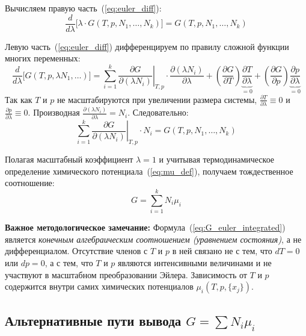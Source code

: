\documentclass[12pt,a4paper]{article}
\begin{document}
Вычисляем правую часть~(\ref{eq:euler_diff}):
\begin{equation}
    \frac{d}{d\lambda} \Big[ \lambda \cdot G(T, p, N_1, \dots, N_k) \Big] = G(T, p, N_1, \dots, N_k)
\end{equation}

Левую часть~(\ref{eq:euler_diff}) дифференцируем по правилу сложной функции многих переменных:
\begin{equation}
    \frac{d}{d\lambda} \Big[ G(T, p, \lambda N_1, \dots) \Big] = \sum_{i=1}^k \left. \frac{\partial G}{\partial (\lambda N_i)} \right|_{T, p} \cdot \frac{\partial (\lambda N_i)}{\partial \lambda} + \left( \frac{\partial G}{\partial T} \right) \underbrace{\frac{\partial T}{\partial \lambda}}_{= 0} + \left( \frac{\partial G}{\partial p} \right) \underbrace{\frac{\partial p}{\partial \lambda}}_{= 0}
\end{equation}
Так как $T$ и $p$ не масштабируются при увеличении размера системы, $\frac{\partial T}{\partial \lambda} \equiv 0$ и $\frac{\partial p}{\partial \lambda} \equiv 0$. Производная $\frac{\partial (\lambda N_i)}{\partial \lambda} = N_i$. Следовательно:
\begin{equation}
    \sum_{i=1}^k \left. \frac{\partial G}{\partial (\lambda N_i)} \right|_{T, p} \cdot N_i = G(T, p, N_1, \dots, N_k)
\end{equation}

Полагая масштабный коэффициент $\lambda = 1$ и учитывая термодинамическое определение химического потенциала~(\ref{eq:mu_def}), получаем тождественное соотношение:
\begin{equation}
    G = \sum_{i=1}^k N_i \mu_i
    \label{eq:G_euler_integrated}
\end{equation}

\textbf{Важное методологическое замечание:} Формула~(\ref{eq:G_euler_integrated}) является \textit{конечным алгебраическим соотношением (уравнением состояния)}, а не дифференциалом. Отсутствие членов с $T$ и $p$ в ней связано не с тем, что $dT=0$ или $dp=0$, а с тем, что $T$ и $p$ являются интенсивными величинами и не участвуют в масштабном преобразовании Эйлера. Зависимость от $T$ и $p$ содержится внутри самих химических потенциалов $\mu_i(T, p, \{x_j\})$.


\subsection{Альтернативные пути вывода \texorpdfstring{$G = \sum N_i \mu_i$}{G = sum Ni mui}}
\end{document}
